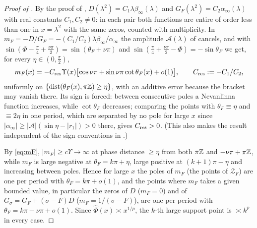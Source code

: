 \begin{proof}[Proof of ]
 By the proof of , $D(\lambda^2)=C_1\lambda\beta_\infty(\lambda)$ and
$G_F(\lambda^2)=C_2\alpha_\infty(\lambda)$ with real constants $C_1,C_2\ne0$: in each pair both functions
are entire of order less than one in $x=\lambda^2$ with the same zeros, counted with multiplicity. In
$m_F=-D/G_F=-(C_1/C_2)\lambda\beta_\infty/\alpha_\infty$ the amplitude $\mathcal A(\lambda)$ of 
cancels, and with $\sin(\Phi-\frac\pi4+\frac{\nu\pi}2)=\sin(\theta_F+\nu\pi)$ and
$\sin(\frac\pi4+\frac{\nu\pi}2-\Phi)=-\sin\theta_F$ we get, for every $\eta\in(0,\frac\pi2)$,
\begin{equation}\label{eq:mF}
  m_F(x)=-C_{\mathrm{res}}\Upsilon(x)\bigl[\cos\nu\pi+\sin\nu\pi\cot\theta_F(x)+o(1)\bigr],\qquad C_{\mathrm{res}}:=-C_1/C_2,
\end{equation}
uniformly on $\{\operatorname{dist}(\theta_F(x),\pi\mathbb{Z})\ge\eta\}$, with an additive error because the
bracket may vanish there. Its sign is forced: between consecutive poles a Nevanlinna function
increases, while $\cot\theta_F$ decreases; comparing the points with $\theta_F\equiv\eta$ and $\equiv2\eta$
in one period, which are separated by no pole for large $x$ since $|\alpha_\infty|\ge|\mathcal A|(\sin\eta-|r_1|)>0$
there, gives $C_{\mathrm{res}}>0$. (This also makes the result independent of the sign conventions in
.)

 By \eqref{eq:mF}, $|m_F|\ge c\Upsilon\to\infty$ at phase distance $\ge\eta$ from both
$\pi\mathbb{Z}$ and $-\nu\pi+\pi\mathbb{Z}$, while $m_F$ is large negative at $\theta_F=k\pi+\eta$, large positive at
$(k+1)\pi-\eta$ and increasing between poles. Hence for large $x$ the poles of $m_F$ (the points of
$\mathcal Z_F$) are one per period with $\theta_F=k\pi+o(1)$, and the points where $m_F$ takes a given
bounded value, in particular the zeros of $D$ ($m_F=0$) and of $G_\sigma=G_F+(\sigma-F)D$
($m_F=1/(\sigma-F)$), are one per period with $\theta_F=k\pi-\nu\pi+o(1)$. Since $\hat\Phi(x)\asymp x^{1/p}$,
the $k$-th large support point is $\asymp k^p$ in every case.


\end{proof}
